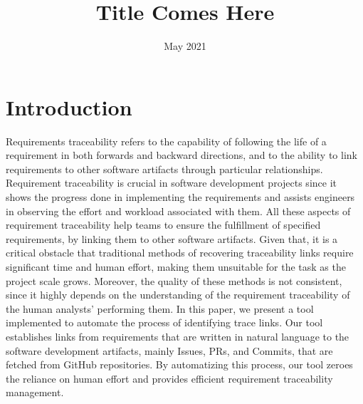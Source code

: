 \documentclass[conference]{IEEEtran}
\begin{document}
\title{Title Comes Here }
\author{
}

\date{May 2021}

\maketitle
\begin{abstract}

\end{abstract}
\begin{IEEEkeywords}

\end{IEEEkeywords}

\section{Introduction} \label{section:introduction}
Requirements traceability refers to the capability of following the life of a requirement in both forwards and backward directions\cite{gotel-1994}, and to the ability to link requirements to other software artifacts through particular relationships. Requirement traceability is crucial in software development projects since it shows the progress done in implementing the requirements and assists engineers in observing the effort and workload associated with them. All these aspects of requirement traceability help teams to ensure the fulfillment of specified requirements, by linking them to other software artifacts. Given that, it is a critical obstacle that traditional methods of recovering traceability links require significant time and human effort, making them unsuitable for the task as the project scale grows. Moreover, the quality of these methods is not consistent, since it highly depends on the understanding of the requirement traceability of the human analysts' performing them. 
In this paper, we present a tool implemented to automate the process of identifying trace links. Our tool establishes links from requirements that are written in natural language to the software development artifacts, mainly Issues, PRs, and Commits, that are fetched from GitHub repositories. By automatizing this process, our tool zeroes the reliance on human effort and provides efficient requirement traceability management.
\end{document}
